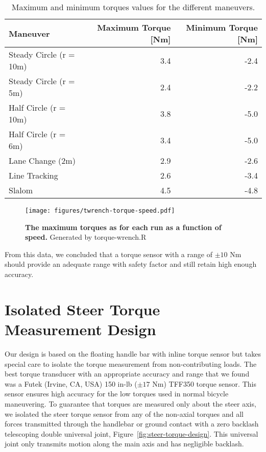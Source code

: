 \documentclass[10pt]{article}
\begin{document}
\begin{table}
  \caption{Maximum and minimum torques values for the different maneuvers.}
  \begin{tabular}{lrr}
    \toprule
    Maneuver & Maximum Torque [Nm] & Minimum Torque [Nm] \\
    \midrule
    Steady Circle (r = 10m) & 3.4 & -2.4 \\
    Steady Circle (r = 5m) & 2.4 & -2.2 \\
    Half Circle (r = 10m) & 3.8 & -5.0 \\
    Half Circle (r = 6m) & 3.4 & -5.0 \\
    Lane Change (2m) & 2.9 & -2.6 \\
    Line Tracking & 2.6 & -3.4 \\
    Slalom & 4.5 & -4.8 \\
    \bottomrule
  \end{tabular}
  \label{tab:maneuver-torque-values}
\end{table}

\begin{figure}
  \centering
  \texttt{[image: figures/twrench-torque-speed.pdf]}
  \caption{{\bf The maximum torques as for each run as a function of speed.}
    Generated by torque-wrench.R}
  \label{fig:twrench-torque-speed}
\end{figure}

From this data, we concluded that a torque sensor with a range of $\pm10$ Nm
should provide an adequate range with safety factor and still retain high
enough accuracy.

\section*{Isolated Steer Torque Measurement Design}

Our design is based on the floating handle bar with inline torque sensor but
takes special care to isolate the torque measurement from non-contributing
loads. The best torque transducer with an appropriate accuracy and range that
we found was a Futek (Irvine, CA, USA) 150 in-lb ($\pm 17$ Nm) TFF350 torque
sensor. This sensor ensures high accuracy for the low torques used in normal
bicycle maneuvering. To guarantee that torques are measured only about the
steer axis, we isolated the steer torque sensor from any of the non-axial
torques and all forces transmitted through the handlebar or ground contact with
a zero backlash telescoping double universal joint,
Figure~\ref{fig:steer-torque-design}. This universal joint only transmits motion
along the main axis and has negligible backlash.
\end{document}
